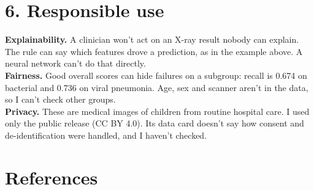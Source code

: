 \documentclass[11pt,letterpaper]{article}
\begin{document}
\section{6. Responsible use}

\textbf{Explainability.} A clinician won't act on an X-ray result nobody can explain. The rule can say which features drove a prediction, as in the example above. A neural network can't do that directly. \\
\textbf{Fairness.} Good overall scores can hide failures on a subgroup: recall is 0.674 on bacterial and 0.736 on viral pneumonia. Age, sex and scanner aren't in the data, so I can't check other groups. \\
\textbf{Privacy.} These are medical images of children from routine hospital care. I used only the public release (CC BY 4.0). Its data card doesn't say how consent and de-identification were handled, and I haven't checked.

\clearpage
\section{References}
\end{document}

